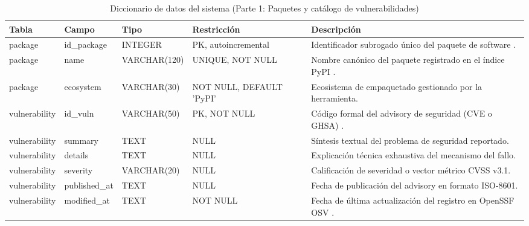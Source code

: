 \begin{table}[H]
\centering
\caption{Diccionario de datos del sistema (Parte 1: Paquetes y catálogo de vulnerabilidades)}
\label{p6:tab:diccionario_datos_p1}
\footnotesize
\singlespacing
\setlength{\tabcolsep}{3.5pt}
\begin{tabularx}{\textwidth}{>{\raggedright\arraybackslash}p{2.3cm} >{\raggedright\arraybackslash}p{2.5cm} >{\raggedright\arraybackslash}p{1.9cm} >{\raggedright\arraybackslash}p{2.7cm} >{\raggedright\arraybackslash}X}
\toprule
\textbf{Tabla} & \textbf{Campo} & \textbf{Tipo} & \textbf{Restricción} & \textbf{Descripción} \\
\midrule
package & id\_package & INTEGER & PK, autoincremental & Identificador subrogado único del paquete de software \cite{torres2026proyecto}. \\
package & name & VARCHAR\allowbreak (120) & UNIQUE, NOT NULL & Nombre canónico del paquete registrado en el índice PyPI \cite{torres2026proyecto}. \\
package & ecosystem & VARCHAR\allowbreak (30) & NOT NULL, DEFAULT 'PyPI' & Ecosistema de empaquetado gestionado por la herramienta. \\
\addlinespace
vulnerability & id\_vuln & VARCHAR\allowbreak (50) & PK, NOT NULL & Código formal del advisory de seguridad (CVE o GHSA) \cite{torres2026proyecto}. \\
vulnerability & summary & TEXT & NULL & Síntesis textual del problema de seguridad reportado. \\
vulnerability & details & TEXT & NULL & Explicación técnica exhaustiva del mecanismo del fallo. \\
vulnerability & severity & VARCHAR\allowbreak (20) & NULL & Calificación de severidad o vector métrico CVSS v3.1. \\
vulnerability & published\_\newline at & TEXT & NULL & Fecha de publicación del advisory en formato ISO-8601. \\
vulnerability & modified\_\newline at & TEXT & NOT NULL & Fecha de última actualización del registro en OpenSSF OSV \cite{openssf2023osv}. \\
\bottomrule
\end{tabularx}
\end{table}

\vspace{0.4cm}

